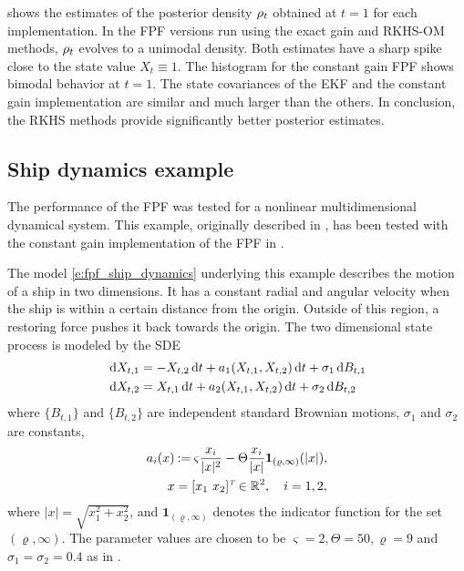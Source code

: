  shows the estimates of the posterior density $\rho_t$ obtained at $t=1$ for each implementation.  In the FPF versions run using the exact gain and RKHS-OM methods, $\rho_t$ evolves to a unimodal density. Both estimates have a sharp spike close to the state value $X_t \equiv 1$. The histogram for the constant gain FPF shows bimodal behavior at $t=1$.  The state covariances of the EKF and the constant gain implementation are similar and much larger than the others. In conclusion, the RKHS methods provide   significantly better posterior estimates.


\subsection{Ship dynamics example} 
\label{s:ship_dynamics}
The performance of the FPF was tested for a nonlinear multidimensional dynamical system. This example, originally described in \cite{budchelee07}, has been tested with the constant gain implementation of the FPF in \cite{tilghiomeh13}.

The model  \eqref{e:fpf_ship_dynamics}
underlying this example  describes the motion of a ship in two dimensions.  It has
a constant radial and angular velocity when the ship is within a certain distance from the origin.  Outside of this region, a
restoring force pushes it back towards the origin. The two dimensional state process is modeled by the SDE
\begin{equation}
\begin{aligned}
\rmd X_{t,1} & = - X_{t,2} \rmd t + a_1(X_{t,1}, X_{t,2}) \rmd t + \sigma_1 \rmd B_{t ,1}\\
\rmd X_{t,2} & = X_{t,1} \rmd t + a_2(X_{t,1}, X_{t,2}) \rmd t + \sigma_2 \rmd B_{t,2}
\label{e:fpf_ship_dynamics}
\end{aligned}
\end{equation}
where $\{B_{t,1}\}$ and $\{B_{t,2}\}$ are independent standard Brownian motions, $\sigma_1$ and $\sigma_2$ are constants,
\[
\begin{aligned}
a_i(x) & \mathbin{:=} \varsigma \frac{x_i}{|x|^2} - \Theta \frac{x_i}{|x|}\mathbf{1}_{(\varrho,\infty)}(|x|),\\
x & = [x_1\,\, x_2]^{\hbox{\tiny\it T}} \in \mathbb{R}^2, \quad i=1,2,
\end{aligned}
\]
where $|x| = \sqrt{x_1^2 + x_2^2}$, and
$\mathbf{1}_{(\varrho,\infty)}$ denotes the indicator function for the set $(\varrho, \infty)$. The parameter values are chosen to be $\varsigma = 2, \Theta  = 50, \varrho = 9$ and $\sigma_1=\sigma_2=0.4$ as in \cite{budchelee07,tilghiomeh13}.

